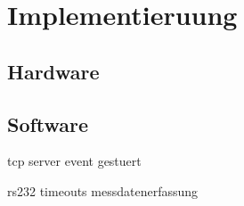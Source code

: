 \chapter{Implementieruung}
\label{chapter_Implementierung}

\section{Hardware}

\section{Software}

tcp server event gestuert

rs232 timeouts messdatenerfassung